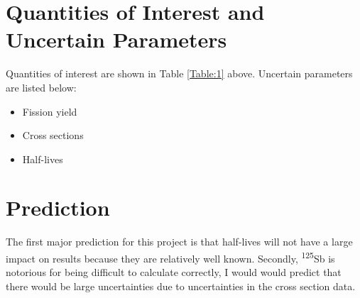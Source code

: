 \documentclass[11pt,notitlepage]{article}
\newcommand{\tss}{\textsuperscript}
\begin{document}

\section{Quantities of Interest and Uncertain Parameters}

Quantities of interest are shown in Table \ref{Table:1} above.
Uncertain parameters are listed below:

\begin{itemize}
\item{Fission yield}
\item{Cross sections}
\item{Half-lives}
\end{itemize}


\section{Prediction}

The first major prediction for this project is that half-lives
will not have a large impact on results because they are
relatively well known. Secondly, \tss{125}Sb is notorious
for being difficult to calculate correctly, I would would predict that
there would be large uncertainties due to uncertainties in
the cross section data.



\end{document}
